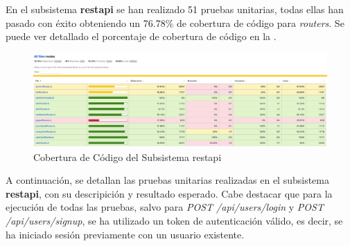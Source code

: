 En el subsistema \textbf{restapi} se han realizado 51 pruebas unitarias, todas ellas han pasado con éxito obteniendo un 76.78\% de cobertura de código para \textit{routers}.
Se puede ver detallado el porcentaje de cobertura de código en la .
\begin{figure}[H]
    \hypertarget{fig:6_8_Cobertura-Code-Restapi}{}
    \centering
    \includegraphics[width=0.8\linewidth]{figures/6-Analisis/6-Pruebas/6_8-Coverage-Restapi.png}
    \caption{Cobertura de Código del Subsistema restapi}
    \label{fig:6_8_Cobertura-Code-Restapi}
\end{figure}

A continuación, se detallan las pruebas unitarias realizadas en el subsistema \textbf{restapi}, con su descripición y resultado esperado.
Cabe destacar que para la ejecución de todas las pruebas, salvo para \textit{POST /api/users/login} y \textit{POST /api/users/signup}, se ha utilizado un token de autenticación válido, 
es decir, se ha iniciado sesión previamente con un usuario existente.



